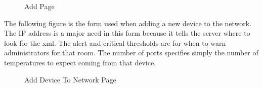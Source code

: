 \documentclass{report}
\begin{document}
\begin{figure}[H]
\caption{Add Page}
\end{figure}

The following figure is the form used when adding a new device to the network.
The IP address is a major need in this form because it tells the server where to look for the xml. 
The alert and critical thresholds are for when to warn administrators for that room.
The number of ports specifies simply the number of temperatures to expect coming from that device.

\begin{figure}[H]
\caption{Add Device To Network Page}
\end{figure}
\end{document}
